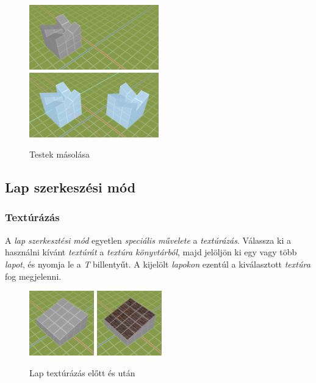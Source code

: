 \begin{figure}[h]
    \centering
    \includegraphics[width=0.5\textwidth]{parts/user-documentation/editor/images/copy1.png}
    \includegraphics[width=0.5\textwidth]{parts/user-documentation/editor/images/copy2.png}
    \caption{Testek másolása}
\end{figure}

\subsection{Lap szerkeszési mód}

\subsubsection{Textúrázás}

A \emph{lap szerkesztési mód} egyetlen \emph{speciális művelete} a \emph{textúrázás}. Válassza ki a használni kívánt \emph{textúrát} a \emph{textúra könyvtárból}, majd jelöljön ki egy vagy több
\emph{lapot}, és nyomja le a \emph{T} billentyűt. A kijelölt \emph{lapokon} ezentúl a kiválasztott
\emph{textúra} fog megjelenni.

\begin{figure}[h]
    \centering
    \includegraphics[width=0.25\textwidth]{parts/user-documentation/editor/images/tex1.png}
    \includegraphics[width=0.25\textwidth]{parts/user-documentation/editor/images/tex2.png}
    \caption{Lap textúrázás előtt és után}
\end{figure}


